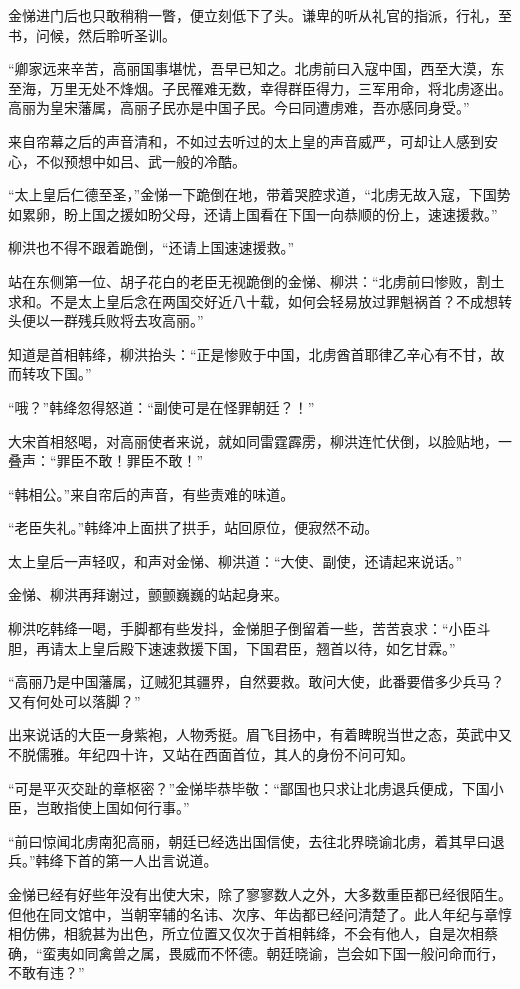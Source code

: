 金悌进门后也只敢稍稍一瞥，便立刻低下了头。谦卑的听从礼官的指派，行礼，至书，问候，然后聆听圣训。

“卿家远来辛苦，高丽国事堪忧，吾早已知之。北虏前曰入寇中国，西至大漠，东至海，万里无处不烽烟。子民罹难无数，幸得群臣得力，三军用命，将北虏逐出。高丽为皇宋藩属，高丽子民亦是中国子民。今曰同遭虏难，吾亦感同身受。”

来自帘幕之后的声音清和，不如过去听过的太上皇的声音威严，可却让人感到安心，不似预想中如吕、武一般的冷酷。

“太上皇后仁德至圣，”金悌一下跪倒在地，带着哭腔求道，“北虏无故入寇，下国势如累卵，盼上国之援如盼父母，还请上国看在下国一向恭顺的份上，速速援救。”

柳洪也不得不跟着跪倒，“还请上国速速援救。”

站在东侧第一位、胡子花白的老臣无视跪倒的金悌、柳洪：“北虏前曰惨败，割土求和。不是太上皇后念在两国交好近八十载，如何会轻易放过罪魁祸首？不成想转头便以一群残兵败将去攻高丽。”

知道是首相韩绛，柳洪抬头：“正是惨败于中国，北虏酋首耶律乙辛心有不甘，故而转攻下国。”

“哦？”韩绛忽得怒道：“副使可是在怪罪朝廷？！”

大宋首相怒喝，对高丽使者来说，就如同雷霆霹雳，柳洪连忙伏倒，以脸贴地，一叠声：“罪臣不敢！罪臣不敢！”

“韩相公。”来自帘后的声音，有些责难的味道。

“老臣失礼。”韩绛冲上面拱了拱手，站回原位，便寂然不动。

太上皇后一声轻叹，和声对金悌、柳洪道：“大使、副使，还请起来说话。”

金悌、柳洪再拜谢过，颤颤巍巍的站起身来。

柳洪吃韩绛一喝，手脚都有些发抖，金悌胆子倒留着一些，苦苦哀求：“小臣斗胆，再请太上皇后殿下速速救援下国，下国君臣，翘首以待，如乞甘霖。”

“高丽乃是中国藩属，辽贼犯其疆界，自然要救。敢问大使，此番要借多少兵马？又有何处可以落脚？”

出来说话的大臣一身紫袍，人物秀挺。眉飞目扬中，有着睥睨当世之态，英武中又不脱儒雅。年纪四十许，又站在西面首位，其人的身份不问可知。

“可是平灭交趾的章枢密？”金悌毕恭毕敬：“鄙国也只求让北虏退兵便成，下国小臣，岂敢指使上国如何行事。”

“前曰惊闻北虏南犯高丽，朝廷已经选出国信使，去往北界晓谕北虏，着其早曰退兵。”韩绛下首的第一人出言说道。

金悌已经有好些年没有出使大宋，除了寥寥数人之外，大多数重臣都已经很陌生。但他在同文馆中，当朝宰辅的名讳、次序、年齿都已经问清楚了。此人年纪与章惇相仿佛，相貌甚为出色，所立位置又仅次于首相韩绛，不会有他人，自是次相蔡确，“蛮夷如同禽兽之属，畏威而不怀德。朝廷晓谕，岂会如下国一般问命而行，不敢有违？”

